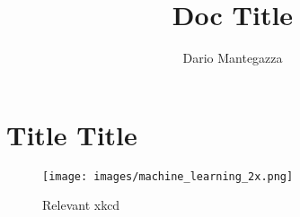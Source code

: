 \documentclass[12pt,a4paper]{article}
\author{Dario Mantegazza}
\title{Doc Title}
\begin{document}
	\maketitle
	\newpage
	\tableofcontents
	\newpage
	\section{Title Title}
	\begin{figure}[h]
		\centering
		\texttt{[image: images/machine\_learning\_2x.png]}
		\caption{Relevant xkcd}
		\label{fig:xkcd}	
	\end{figure}
\end{document}
